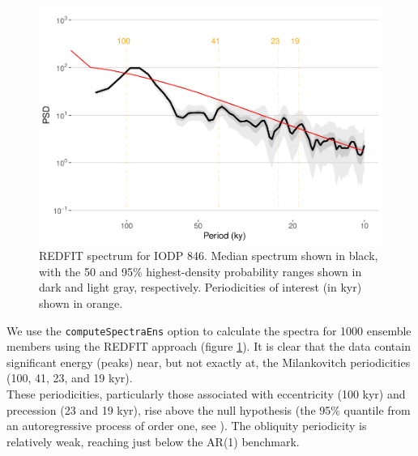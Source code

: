 \documentclass[gchron, manuscript]{copernicus}
\begin{document}
\begin{figure}
\includegraphics[width=12cm]{geoChronR-paper_files/figure-latex/redfit-plot-1} \caption{REDFIT spectrum for IODP 846. Median spectrum shown in black, with the 50 and 95\% highest-density probability ranges shown in dark and light gray, respectively. Periodicities of interest (in kyr) shown in orange.}\label{fig:redfit-plot}
\end{figure}

We use the \texttt{computeSpectraEns} option to calculate the spectra for 1000 ensemble members using the REDFIT approach (figure \ref{fig:redfit-plot}). It is clear that the data contain significant energy (peaks) near, but not exactly at, the Milankovitch periodicities (100, 41, 23, and 19 kyr).\\
These periodicities, particularly those associated with eccentricity (100 kyr) and precession (23 and 19 kyr), rise above the null hypothesis (the 95\% quantile from an autoregressive process of order one, see \citet{Mudelsee_NPG09}).
The obliquity periodicity is relatively weak, reaching just below the AR(1) benchmark.
\end{document}
